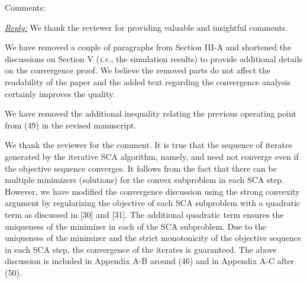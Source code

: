 Comments:

\vspace{1eM}
\underline{\textit{Reply:}} We thank the reviewer for providing valuable and insightful comments.

\vspace{1eM}

\begin{enumerate}
 

\resp We have removed a couple of paragraphs from Section III-A and shortened the discussions on Section V (\textit{i.e.}, the simulation results) to provide additional details on the convergence proof. We believe the removed parts do not affect the readability of the paper and the added text regarding the convergence analysis certainly improves the quality. 

 

\resp We have removed the additional inequality relating the previous operating point from (49) in the revised manuscript. 

 

\resp We thank the reviewer for the comment. It is true that the sequence of iterates generated by the iterative \ac{SCA} algorithm, namely,  and  need not converge even if the objective sequence converges. It follows from the fact that there can be multiple minimizers (solutions) for the convex subproblem in each \ac{SCA} step. However, we have modified the convergence discussion using the strong convexity argument by regularizing the objective of each \ac{SCA} subproblem with a quadratic term as discussed in [30] and [31]. The additional quadratic term ensures the uniqueness of the minimizer in each of the \ac{SCA} subproblem. Due to the uniqueness of the minimizer and the strict monotonicity of the objective sequence in each \ac{SCA} step, the convergence of the iterates is guaranteed. The above discussion is included in Appendix A-B around (46) and in Appendix A-C after (50).


\end{enumerate}
